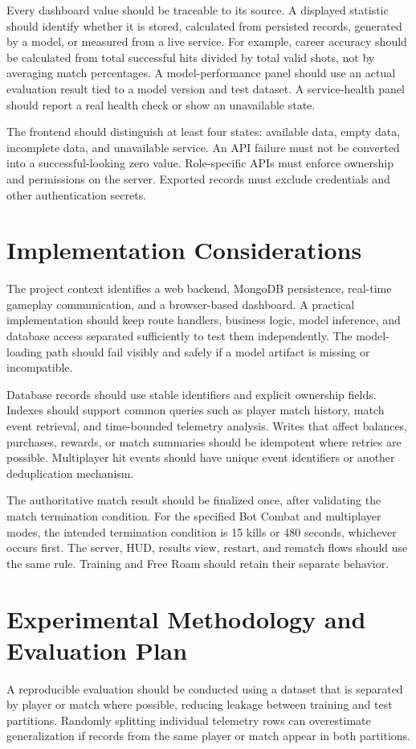 \documentclass[conference]{IEEEtran}
\begin{document}
Every dashboard value should be traceable to its source. A displayed statistic should identify whether it is stored, calculated from persisted records, generated by a model, or measured from a live service. For example, career accuracy should be calculated from total successful hits divided by total valid shots, not by averaging match percentages. A model-performance panel should use an actual evaluation result tied to a model version and test dataset. A service-health panel should report a real health check or show an unavailable state.

The frontend should distinguish at least four states: available data, empty data, incomplete data, and unavailable service. An API failure must not be converted into a successful-looking zero value. Role-specific APIs must enforce ownership and permissions on the server. Exported records must exclude credentials and other authentication secrets.

\section{Implementation Considerations}
The project context identifies a web backend, MongoDB persistence, real-time gameplay communication, and a browser-based dashboard. A practical implementation should keep route handlers, business logic, model inference, and database access separated sufficiently to test them independently. The model-loading path should fail visibly and safely if a model artifact is missing or incompatible.

Database records should use stable identifiers and explicit ownership fields. Indexes should support common queries such as player match history, match event retrieval, and time-bounded telemetry analysis. Writes that affect balances, purchases, rewards, or match summaries should be idempotent where retries are possible. Multiplayer hit events should have unique event identifiers or another deduplication mechanism.

The authoritative match result should be finalized once, after validating the match termination condition. For the specified Bot Combat and multiplayer modes, the intended termination condition is 15 kills or 480 seconds, whichever occurs first. The server, HUD, results view, restart, and rematch flows should use the same rule. Training and Free Roam should retain their separate behavior.

\section{Experimental Methodology and Evaluation Plan}
A reproducible evaluation should be conducted using a dataset that is separated by player or match where possible, reducing leakage between training and test partitions. Randomly splitting individual telemetry rows can overestimate generalization if records from the same player or match appear in both partitions.
\end{document}
